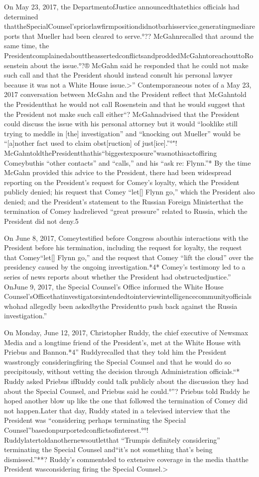 {On May 23, 2017, the DepartmentofJustice announcedthatethics officials had determined thattheSpecialCounsel’spriorlawfirmpositiondidnotbarhisservice,generatingmediareports that Mueller had been cleared to serve.°?? McGahnrecalled that around the same time, the PresidentcomplainedabouttheassertedconflictsandproddedMcGahntoreachouttoRosenstein about the issue.°?® McGahn said he responded that he could not make such call and that the President should instead consult his personal lawyer because it was not a White House issue.>” Contemporaneous notes of a May 23, 2017 conversation between McGahn and the President reflect that McGahntold the Presidentthat he would not call Rosenstein and that he would suggest that the President not make such call either“? McGahnadvised that the President could discuss the issue with his personal attorney but it would “looklike still trying to meddle in [the] investigation” and “knocking out Mueller” would be “[a]nother fact used to claim obst[ruction] of just[ice].”°"! McGahntoldthePresidentthathis“biggestexposure”wasnothisactoffiring Comeybuthis “other contacts” and “calls,” and his “ask re: Flynn.”* By the time McGahn provided this advice to the President, there had been widespread reporting on the President’s request for Comey’s loyalty, which the President publicly denied; his request that Comey “let[] Flynn go,” which the President also denied; and the President’s statement to the Russian Foreign Ministerthat the termination of Comey hadrelieved “great pressure” related to Russia, which the President did not deny.5

On June 8, 2017, Comeytestified before Congress abouthis interactions with the President before his termination, including the request for loyalty, the request that Comey“let[] Flynn go,” and the request that Comey “lift the cloud” over the presidency caused by the ongoing investigation.*4* Comey’s testimony led to a series of news reports about whether the President had obstructedjustice.” OnJune 9, 2017, the Special Counsel’s Office informed the White House Counsel’sOfficethatinvestigatorsintendedtointerviewintelligencecommunityofficialswhohad allegedly been askedbythe Presidentto push back against the Russia investigation.”

On Monday, June 12, 2017, Christopher Ruddy, the chief executive of Newsmax Media and a longtime friend of the President’s, met at the White House with Priebus and Bannon.*4” Ruddyrecalled that they told him the President wasstrongly consideringfiring the Special Counsel and that he would do so precipitously, without vetting the decision through Administration officials.“* Ruddy asked Priebus ifRuddy could talk publicly about the discussion they had about the Special Counsel, and Priebus said he could.°”? Priebus told Ruddy he hoped another blow up like the one that followed the termination of Comey did not happen.Later that day, Ruddy stated in a televised interview that the President was “considering perhaps terminating the Special Counsel”basedonpurportedconflictsofinterest.°°! Ruddylatertoldanothernewsoutletthat “Trumpis definitely considering” terminating the Special Counsel and“it’s not something that’s being dismissed.”**? Ruddy’s commentsled to extensive coverage in the media thatthe President wasconsidering firing the Special Counsel.>

}
